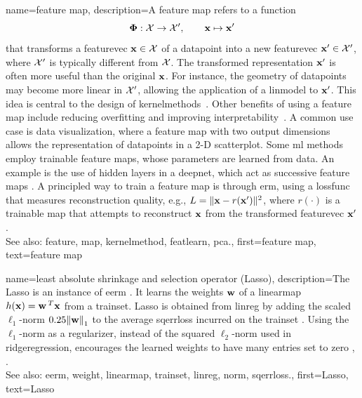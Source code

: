 {name={feature map}, 
	description={A \gls{feature} \gls{map} refers to a \gls{function} 
		$$
		{\bf \Phi}: \mathcal{X} \rightarrow \mathcal{X}', \qquad {\bf x} \mapsto {\bf x}'
		$$
		that transforms a \gls{featurevec} ${\bf x} \in \mathcal{X}$ of 
 		a \gls{datapoint} into a new \gls{featurevec} ${\bf x}' \in \mathcal{X}'$, 
 		where $\mathcal{X}'$ is typically different from $\mathcal{X}$.
 		The transformed representation ${\bf x}'$ is often more useful than the original 
 		${\bf x}$. For instance, the geometry of \glspl{datapoint} may become more linear 
 		in $\mathcal{X}'$, allowing the application of a \gls{linmodel} to ${\bf x}'$. 
 		This idea is central to the design of \glspl{kernelmethod}~\cite{LearningKernelsBook}.
 		Other benefits of using a \gls{feature} \gls{map} include reducing \gls{overfitting} and 
 		improving \gls{interpretability}~\cite{Ribeiro2016}. A common use case is \gls{data} 
 		visualization, where a \gls{feature} \gls{map} with two output dimensions allows the representation 
 		of \glspl{datapoint} in a 2-D \gls{scatterplot}. Some \gls{ml} methods employ trainable 
 		\gls{feature} \glspl{map}, whose \glspl{parameter} are learned from \gls{data}. An example is 
 		the use of hidden \glspl{layer} in a \gls{deepnet}, which act as successive \gls{feature} \glspl{map} 
 		\cite{MallatUnderstandingDeepLearning}. A principled way to train a \gls{feature} \gls{map} 
 		is through \gls{erm}, using a \gls{lossfunc} that measures reconstruction quality, 
 		e.g., $L = \|{\bf x} - r({\bf x}')\|^2$, where $r(\cdot)$ is a trainable
 		\gls{map} that attempts to reconstruct ${\bf x}$ from the transformed \gls{featurevec} ${\bf x}'$.
				\\
		See also: \gls{feature}, \gls{map}, \gls{kernelmethod}, \gls{featlearn}, \gls{pca}.},
	first={feature map},
	text={feature map} 
}
 
{name={least absolute shrinkage and selection operator (Lasso)}, 
	description={The Lasso  is an 
		instance of \gls{eerm} \cite{hastie01statisticallearning}. It learns the \glspl{weight} 
		${\bf w}$ of a \gls{linearmap} $h({\bf x}) = {\bf w}\,^{T} {\bf x}$ from a \gls{trainset}. 
		Lasso is obtained from \gls{linreg} by adding the scaled $\ell_{1}$-\gls{norm} 
		$\regparam \normgeneric{\weights}{1}$ to the average \gls{sqerrloss} incurred on 
		the \gls{trainset} \cite{Tibshirani1996}. Using the $\ell_{1}$-\gls{norm} as a \gls{regularizer}, 
		instead of the squared $\ell_{2}$-\gls{norm} used in \gls{ridgeregression}, encourages the 
		learned \glspl{weight} to have many entries set to zero \cite{Wain2019}, \cite{BuhlGeerBook}.
				\\
		See also: \gls{eerm}, \gls{weight}, \gls{linearmap}, \gls{trainset}, \gls{linreg}, \gls{norm}, \gls{sqerrloss}.},
	first={Lasso},
	text={Lasso} 
}
 
